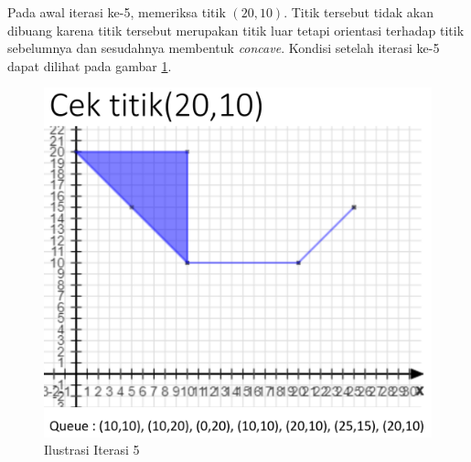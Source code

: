\par Pada awal iterasi ke-5, memeriksa titik $(20,10)$. Titik tersebut tidak akan dibuang karena titik tersebut merupakan titik luar tetapi orientasi terhadap titik sebelumnya dan sesudahnya membentuk \textit{concave}. Kondisi setelah iterasi ke-5 dapat dilihat pada gambar \ref{fig:iterasi-5}.
\begin{figure}[!h]
	\Centering
	\includegraphics [width=\columnwidth]{bab5/img/iterasi-5}
	\caption {Ilustrasi Iterasi 5}
	\label {fig:iterasi-5}
\end{figure}

